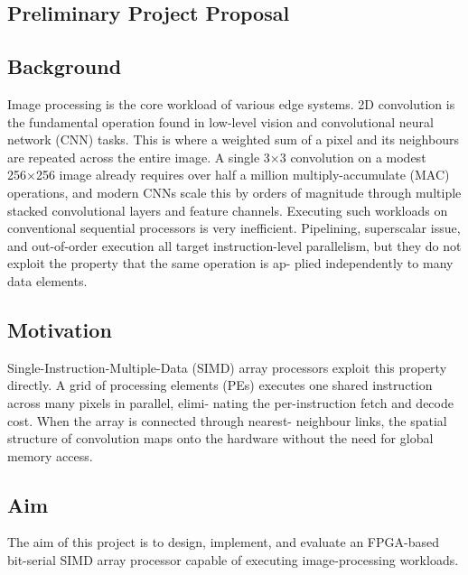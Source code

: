 \begin{uomappendix} 

    \section{Preliminary Project Proposal} \label{sec:ProjectProposal}
    \subsection{Background}
    
        Image processing is the core workload of various edge systems. 2D convolution is the fundamental operation found in low-level vision and convolutional neural network (CNN) tasks. This is where a weighted sum of a pixel and its neighbours are repeated across the entire image. A single 3×3 convolution on a modest 256×256 image already requires over half a million multiply-accumulate (MAC) operations, and modern CNNs scale this by orders of magnitude through multiple stacked convolutional layers and feature channels. Executing such workloads on conventional sequential processors is very inefficient. Pipelining, superscalar issue, and out-of-order execution all target instruction-level parallelism, but they do not exploit the property that the same operation is ap- plied independently to many data elements.
            
    \subsection{Motivation}
    
    Single-Instruction-Multiple-Data (SIMD) array processors exploit this property directly. A grid of processing elements (PEs) executes one shared instruction across many pixels in parallel, elimi- nating the per-instruction fetch and decode cost. When the array is connected through nearest- neighbour links, the spatial structure of convolution maps onto the hardware without the need for global memory access.
    
    \subsection{Aim}
    
    The aim of this project is to design, implement, and evaluate an FPGA-based bit-serial SIMD array processor capable of executing image-processing workloads.
    

\end{uomappendix}
